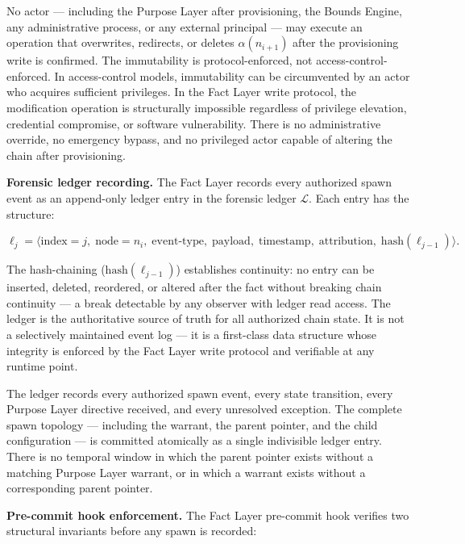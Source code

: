No actor — including the Purpose Layer after provisioning, the Bounds Engine, any administrative process, or any external principal — may execute an operation that overwrites, redirects, or deletes $\alpha(n_{i+1})$ after the provisioning write is confirmed. The immutability is protocol-enforced, not access-control-enforced. In access-control models, immutability can be circumvented by an actor who acquires sufficient privileges. In the Fact Layer write protocol, the modification operation is structurally impossible regardless of privilege elevation, credential compromise, or software vulnerability. There is no administrative override, no emergency bypass, and no privileged actor capable of altering the chain after provisioning.

\medskip
\noindent\textbf{Forensic ledger recording.} The Fact Layer records every authorized spawn event as an append-only ledger entry in the forensic ledger $\mathcal{L}$. Each entry has the structure:

\begin{equation}
\ell_j = \bigl\langle
\text{index}=j,\;
\text{node}=n_i,\;
\text{event-type},\;
\text{payload},\;
\text{timestamp},\;
\text{attribution},\;
\text{hash}(\ell_{j-1})
\bigr\rangle .
\label{eq:ledger-entry}
\end{equation}

The hash-chaining ($\text{hash}(\ell_{j-1})$) establishes continuity: no entry can be inserted, deleted, reordered, or altered after the fact without breaking chain continuity — a break detectable by any observer with ledger read access. The ledger is the authoritative source of truth for all authorized chain state. It is not a selectively maintained event log — it is a first-class data structure whose integrity is enforced by the Fact Layer write protocol and verifiable at any runtime point.

The ledger records every authorized spawn event, every state transition, every Purpose Layer directive received, and every unresolved exception. The complete spawn topology — including the warrant, the parent pointer, and the child configuration — is committed atomically as a single indivisible ledger entry. There is no temporal window in which the parent pointer exists without a matching Purpose Layer warrant, or in which a warrant exists without a corresponding parent pointer.

\medskip
\noindent\textbf{Pre-commit hook enforcement.} The Fact Layer pre-commit hook verifies two structural invariants before any spawn is recorded:

